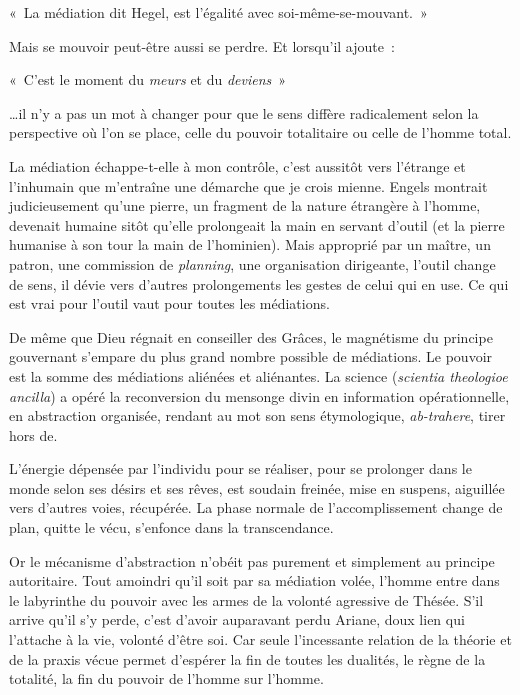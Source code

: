 \documentclass[french,twoside]{book} %
\newenvironment{quoteblock}%
  {\begin{quoting}}
  {\end{quoting}}
\newenvironment{quotebar}{%
    \def\FrameCommand{{\color{rubric!10!}\vrule width 0.5em} \hspace{0.9em}}%
    \def\OuterFrameSep{\itemsep} %
    \MakeFramed {\advance\hsize-\width \FrameRestore}
  }%
  {%
    \endMakeFramed
  }
\renewenvironment{quoteblock}%
  {%
    \savenotes
    \setstretch{0.9}
    \normalfont
    \begin{quotebar}
  }
  {%
    \end{quotebar}
    \spewnotes
  }
\begin{document}
\begin{quoteblock}
\noindent « La médiation dit Hegel, est l’égalité avec soi-même-se-mouvant. »\end{quoteblock}

\noindent Mais se mouvoir peut-être aussi se perdre. Et lorsqu’il ajoute :\par

\begin{quoteblock}
\noindent « C’est le moment du \emph{meurs} et du \emph{deviens} »\end{quoteblock}

\noindent …il n’y a pas un mot à changer pour que le sens diffère radicalement selon la perspective où l’on se place, celle du pouvoir totalitaire ou celle de l’homme total.\par
La médiation échappe-t-elle à mon contrôle, c’est aussitôt vers l’étrange et l’inhumain que m’entraîne une démarche que je crois mienne. Engels montrait judicieusement qu’une pierre, un fragment de la nature étrangère à l’homme, devenait humaine sitôt qu’elle prolongeait la main en servant d’outil (et la pierre humanise à son tour la main de l’hominien). Mais approprié par un maître, un patron, une commission de \emph{planning}, une organisation dirigeante, l’outil change de sens, il dévie vers d’autres prolongements les gestes de celui qui en use. Ce qui est vrai pour l’outil vaut pour toutes les médiations.\par
De même que Dieu régnait en conseiller des Grâces, le magnétisme du principe gouvernant s’empare du plus grand nombre possible de médiations. Le pouvoir est la somme des médiations aliénées et aliénantes. La science (\emph{scientia theologioe ancilla}) a opéré la reconversion du mensonge divin en information opérationnelle, en abstraction organisée, rendant au mot son sens étymologique, \emph{ab-trahere}, tirer hors de.\par
L’énergie dépensée par l’individu pour se réaliser, pour se prolonger dans le monde selon ses désirs et ses rêves, est soudain freinée, mise en suspens, aiguillée vers d’autres voies, récupérée. La phase normale de l’accomplissement change de plan, quitte le vécu, s’enfonce dans la transcendance.\par
Or le mécanisme d’abstraction n’obéit pas purement et simplement au principe autoritaire. Tout amoindri qu’il soit par sa médiation volée, l’homme entre dans le labyrinthe du pouvoir avec les armes de la volonté agressive de Thésée. S’il arrive qu’il s’y perde, c’est d’avoir auparavant perdu Ariane, doux lien qui l’attache à la vie, volonté d’être soi. Car seule l’incessante relation de la théorie et de la praxis vécue permet d’espérer la fin de toutes les dualités, le règne de la totalité, la fin du pouvoir de l’homme sur l’homme.\par
\end{document}
